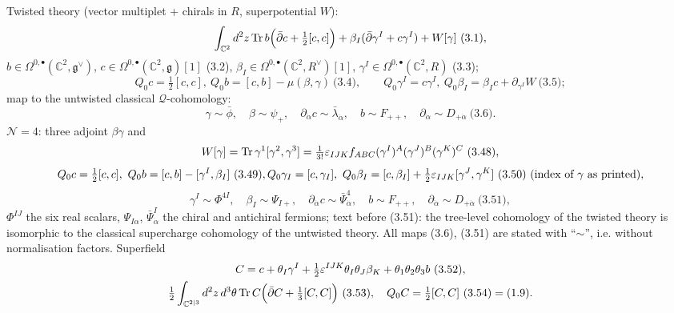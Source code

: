 \documentclass[10pt]{article}
\begin{document}
Twisted theory (vector multiplet + chirals in $R$, superpotential $W$):
\begin{equation*}
\int_{\mathbb C^2}d^2z\,{\rm Tr}\,b\Big(\bar\partial c+\tfrac12[c,c]\Big)+\beta_I(\bar\partial\gamma^I+c\gamma^I)+W[\gamma]\ \text{(3.1)},
\end{equation*}
$b\in\Omega^{0,\bullet}(\mathbb C^2,\mathfrak g^\vee)$, $c\in\Omega^{0,\bullet}(\mathbb C^2,\mathfrak g)[1]$ (3.2), $\beta_I\in\Omega^{0,\bullet}(\mathbb C^2,R^\vee)[1]$, $\gamma^I\in\Omega^{0,\bullet}(\mathbb C^2,R)$ (3.3);
\begin{equation*}
Q_0c=\tfrac12[c,c],\ Q_0b=[c,b]-\mu(\beta,\gamma)\ \text{(3.4)},\qquad Q_0\gamma^I=c\gamma^I,\ Q_0\beta_I=\beta_Ic+\partial_{\gamma^I}W\ \text{(3.5)};
\end{equation*}
map to the untwisted classical $\mathcal Q$-cohomology:
\begin{equation*}
\gamma\sim\bar\phi,\quad\beta\sim\psi_+,\quad\partial_{\dot\alpha}c\sim\bar\lambda_{\dot\alpha},\quad b\sim F_{++},\quad\partial_{\dot\alpha}\sim D_{+\dot\alpha}\ \text{(3.6)}.
\end{equation*}
$\mathcal N=4$: three adjoint $\beta\gamma$ and
\begin{equation*}
W[\gamma]={\rm Tr}\,\gamma^1[\gamma^2,\gamma^3]=\tfrac1{3!}\varepsilon_{IJK}f_{ABC}(\gamma^I)^A(\gamma^J)^B(\gamma^K)^C\ \text{(3.48)},
\end{equation*}
\begin{equation*}
Q_0c=\tfrac12[c,c],\ Q_0b=[c,b]-[\gamma^I,\beta_I]\ \text{(3.49)},\\ Q_0\gamma_I=[c,\gamma_I],\ Q_0\beta_I=[c,\beta_I]+\tfrac12\varepsilon_{IJK}[\gamma^J,\gamma^K]\ \text{(3.50) (index of $\gamma$ as printed)},
\end{equation*}
\begin{equation*}
\gamma^I\sim\Phi^{4I},\quad\beta_I\sim\Psi_{I+},\quad\partial_{\dot\alpha}c\sim\bar\Psi^4_{\dot\alpha},\quad b\sim F_{++},\quad\partial_{\dot\alpha}\sim D_{+\dot\alpha}\ \text{(3.51)},
\end{equation*}
$\Phi^{IJ}$ the six real scalars, $\Psi_{I\alpha}$, $\bar\Psi^I_{\dot\alpha}$ the chiral and antichiral fermions; text before (3.51): the tree-level cohomology of the twisted theory is isomorphic to the classical supercharge cohomology of the untwisted theory. All maps (3.6), (3.51) are stated with ``$\sim$'', i.e. without normalisation factors. Superfield
\begin{gather*}
C=c+\theta_I\gamma^I+\tfrac12\varepsilon^{IJK}\theta_I\theta_J\beta_K+\theta_1\theta_2\theta_3b\ \text{(3.52)},\\
\tfrac12\int_{\mathbb C^{2|3}}d^2z\,d^3\theta\,{\rm Tr}\,C\Big(\bar\partial C+\tfrac13[C,C]\Big)\ \text{(3.53)},\quad Q_0C=\tfrac12[C,C]\ \text{(3.54)}=\text{(1.9)}.
\end{gather*}
\end{document}
